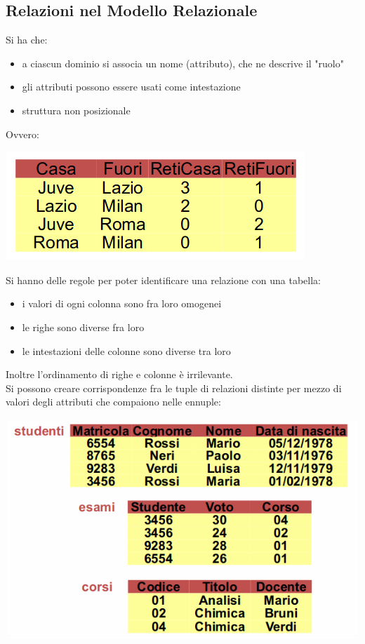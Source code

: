 \documentclass[a4paper,12pt, oneside]{book}
\begin{document}
\subsection{Relazioni nel Modello Relazionale}
Si ha che:
\begin{itemize}
	\item a ciascun dominio si associa un nome (attributo), che  ne descrive il "ruolo"
	\item gli attributi possono essere usati come intestazione
	\item struttura non posizionale
\end{itemize}
Ovvero:
\begin{center}
	\includegraphics[scale=0.7]{img/rel3.png}
\end{center}
Si hanno delle regole per poter identificare una relazione con una tabella:
\begin{itemize}
	\item i valori di ogni colonna sono fra loro omogenei 
	\item le righe sono diverse fra loro
	\item le intestazioni delle colonne sono diverse tra loro 
\end{itemize}
Inoltre l'ordinamento di righe e colonne è irrilevante.\\
Si possono creare corrispondenze fra le tuple di relazioni distinte per mezzo di valori degli attributi che compaiono nelle ennuple:
\begin{center}
	\includegraphics[scale=0.7]{img/rel4.png}
\end{center}
\end{document}
